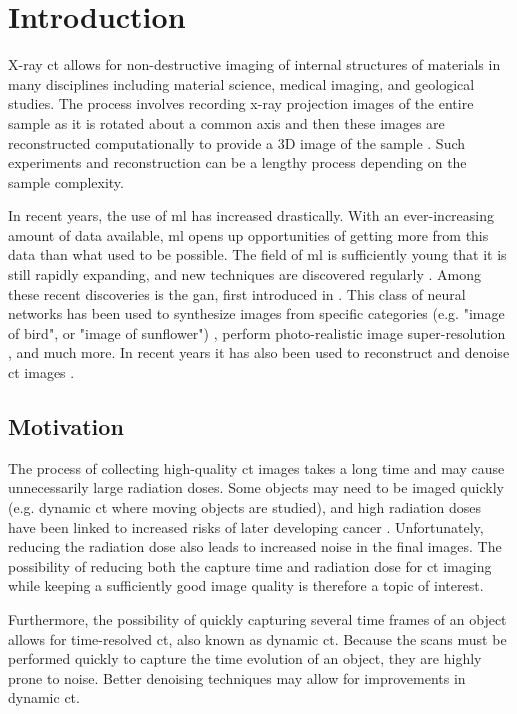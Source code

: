 \chapter{Introduction}
\label{sec:introduction}
X-ray \gls{ct} allows for non-destructive imaging of internal structures of materials in many disciplines including material science, medical imaging, and geological studies. The process involves recording x-ray projection images of the entire sample as it is rotated about a common axis and then these images are reconstructed computationally to provide a 3D image of the sample \cite{KakSlaney98}. Such experiments and reconstruction can be a lengthy process depending on the sample complexity. 

In recent years, the use of \gls{ml} has increased drastically. With an ever-increasing amount of data available, \gls{ml} opens up opportunities of getting more from this data than what used to be possible. The field of \gls{ml} is sufficiently young that it is still rapidly expanding, and new techniques are discovered regularly \cite{Jordan255}. Among these recent discoveries is the \gls{gan}, first introduced in \citeyear{goodfellow2014gan} \cite{goodfellow2014gan}. This class of neural networks has been used to synthesize images from specific categories (e.g. "image of bird", or "image of sunflower") \cite{Bao_2017_ICCV}, perform photo-realistic image super-resolution \cite{Ledig_2017_CVPR}, and much more. In recent years it has also been used to reconstruct and denoise \gls{ct} images \cite{GANrec,liu2020tomogan}. 

\section{Motivation}
The process of collecting high-quality \gls{ct} images takes a long time and may cause unnecessarily large radiation doses. Some objects may need to be imaged quickly (e.g. dynamic \gls{ct} where moving objects are studied), and high radiation doses have been linked to increased risks of later developing cancer \cite{doi:10.1056/NEJMra072149,PEARCE2012499}. Unfortunately, reducing the radiation dose also leads to increased noise in the final images. The possibility of reducing both the capture time and radiation dose for \gls{ct} imaging while keeping a sufficiently good image quality is therefore a topic of interest. 

Furthermore, the possibility of quickly capturing several time frames of an object allows for time-resolved \gls{ct}, also known as dynamic \gls{ct}. Because the scans must be performed quickly to capture the time evolution of an object, they are highly prone to noise. Better denoising techniques may allow for improvements in dynamic \gls{ct}. 

